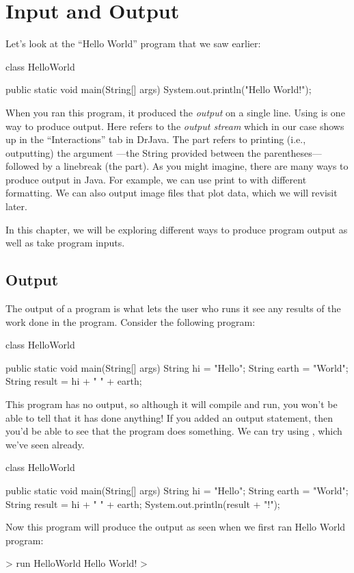 \chapter{Input and Output}

Let's look at the ``Hello World'' program that we saw earlier:
\begin{code}
class HelloWorld {

    public static void main(String[] args) {
        System.out.println("Hello World!");
    }

}
\end{code}

When you ran this program, it produced the \emph{output}  on a single line.
Using  is one way to
produce output. Here  refers to the \emph{output stream}
which in our case shows up in the ``Interactions'' tab in DrJava.
The  part refers to printing (i.e., outputting) the argument
---the String provided between the parentheses---followed by a linebreak (the  part).
As you might imagine, there are many ways to produce output in Java. For example, we can use print to  with different formatting. We can also output image files that
plot data, which we will revisit later. 

In this chapter, we will be exploring different ways to produce program output
as well as take program inputs.

\section{Output}
The output of a program is what lets the user who runs it
see any results of the work done in the program.
Consider the following program:
\begin{code}
class HelloWorld {

    public static void main(String[] args) {
        String hi = "Hello";
        String earth = "World";
        String result = hi + " " + earth;
    }

}
\end{code}
This program has no output, so although it will compile and run, you won't
be able to tell that it has done anything!
If you added an output statement, then you'd be able to see that
the program does something. We can try using ,
which we've seen already.
\begin{code}
class HelloWorld {

    public static void main(String[] args) {
        String hi = "Hello";
        String earth = "World";
        String result = hi + " " + earth;
        System.out.println(result + "!");
    }

}
\end{code}
Now this program will produce the output as seen when we first ran Hello World program:
\begin{code}
> run HelloWorld
Hello World!
>
\end{code}

